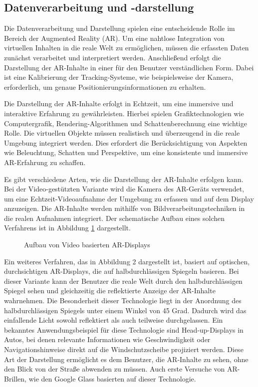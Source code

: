 \subsection{Datenverarbeitung und -darstellung}
Die Datenverarbeitung und Darstellung spielen eine entscheidende Rolle im
Bereich der Augmented Reality (AR). Um eine nahtlose Integration von virtuellen
Inhalten in die reale Welt zu ermöglichen, müssen die erfassten Daten zunächst
verarbeitet und interpretiert werden. Anschließend erfolgt die Darstellung der
AR-Inhalte in einer für den Benutzer verständlichen Form. Dabei ist eine
Kalibrierung der Tracking-Systeme, wie beispielsweise der Kamera, erforderlich,
um genaue Positionierungsinformationen zu erhalten.

Die Darstellung der AR-Inhalte erfolgt in Echtzeit, um eine immersive und
interaktive Erfahrung zu gewährleisten. Hierbei spielen Grafiktechnologien wie
Computergrafik, Rendering-Algorithmen und Schattenberechnung eine wichtige Rolle. Die
virtuellen Objekte müssen realistisch und überzeugend in die reale Umgebung
integriert werden. Dies erfordert die Berücksichtigung von Aspekten wie
Beleuchtung, Schatten und Perspektive, um eine konsistente und immersive
AR-Erfahrung zu schaffen.

Es gibt verschiedene Arten, wie die Darstellung der AR-Inhalte erfolgen kann.
Bei der Video-gestützten Variante wird die Kamera des AR-Geräts verwendet, um
eine Echtzeit-Videoaufnahme der Umgebung zu erfassen und auf dem Display
anzuzeigen. Die AR-Inhalte werden mithilfe von Bildverarbeitungstechniken in
die realen Aufnahmen integriert. Der schematische Aufbau eines solchen
Verfahrens ist in Abbildung \ref{fig:VBAR} dargestellt.\\

\begin{figure}[h]
      \centering
      
      \caption[width=0.7\columnwidth]{Aufbau von Video basierten AR-Displays \cite{billinghurst2015survey}}
      \label{fig:VBAR}
\end{figure}

Ein weiteres Verfahren, das in Abbildung 2 dargestellt ist, basiert auf
optischen, durchsichtigen AR-Displays, die auf halbdurchlässigen Spiegeln
basieren. Bei dieser Variante kann der Benutzer die reale Welt durch den
halbdurchlässigen Spiegel sehen und gleichzeitig die reflektierte Anzeige der
AR-Inhalte wahrnehmen. Die Besonderheit dieser Technologie liegt in der
Anordnung des halbdurchlässigen Spiegels unter einem Winkel von 45 Grad.
Dadurch wird das einfallende Licht sowohl reflektiert als auch teilweise
durchgelassen. Ein bekanntes Anwendungsbeispiel für diese Technologie sind
Head-up-Displays in Autos, bei denen relevante Informationen wie
Geschwindigkeit oder Navigationshinweise direkt auf die Windschutzscheibe
projiziert werden. Diese Art der Darstellung ermöglicht es dem Benutzer, die
AR-Inhalte zu sehen, ohne den Blick von der Straße abwenden zu müssen. Auch
erste Versuche von AR-Brillen, wie den Google Glass basierten auf dieser
Technologie.\\

